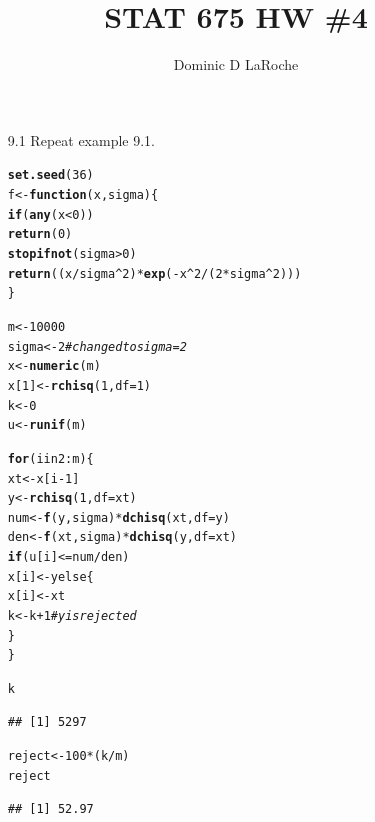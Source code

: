 \documentclass{article}\usepackage[]{graphicx}\usepackage[]{color}
\title{STAT 675 HW \#4}
\author{Dominic D LaRoche}
\makeatletter
\newcommand{\hlcom}[1]{\textcolor[rgb]{0.678,0.584,0.686}{\textit{#1}}}%
\newcommand{\hlkwd}[1]{\textcolor[rgb]{0.737,0.353,0.396}{\textbf{#1}}}%
\newenvironment{kframe}{%
 \def\at@end@of@kframe{}%
 \ifinner\ifhmode%
  \def\at@end@of@kframe{\end{minipage}}%
  \begin{minipage}{\columnwidth}%
 \fi\fi%
 \def\FrameCommand##1{\hskip\@totalleftmargin \hskip-\fboxsep
 \colorbox{shadecolor}{##1}\hskip-\fboxsep
     \hskip-\linewidth \hskip-\@totalleftmargin \hskip\columnwidth}%
 \MakeFramed {\advance\hsize-\width
   \@totalleftmargin\z@ \linewidth\hsize
   \@setminipage}}%
 {\par\unskip\endMakeFramed%
 \at@end@of@kframe}
\newenvironment{knitrout}{}{} %
\makeatother
\begin{document}
\maketitle

\begin{itemize}
\item[9.1] Repeat example 9.1.\\

\begin{knitrout}
\color{fgcolor}\begin{kframe}
\begin{alltt}
\hlkwd{set.seed}(36)
f <- \hlkwd{function}(x, sigma) \{
    \hlkwd{if} (\hlkwd{any}(x < 0)) 
        \hlkwd{return}(0)
    \hlkwd{stopifnot}(sigma > 0)
    \hlkwd{return}((x/sigma^2) * \hlkwd{exp}(-x^2/(2 * sigma^2)))
\}

m <- 10000
sigma <- 2  \hlcom{#changed to sigma=2}
x <- \hlkwd{numeric}(m)
x[1] <- \hlkwd{rchisq}(1, df = 1)
k <- 0
u <- \hlkwd{runif}(m)

\hlkwd{for} (i in 2:m) \{
    xt <- x[i - 1]
    y <- \hlkwd{rchisq}(1, df = xt)
    num <- \hlkwd{f}(y, sigma) * \hlkwd{dchisq}(xt, df = y)
    den <- \hlkwd{f}(xt, sigma) * \hlkwd{dchisq}(y, df = xt)
    \hlkwd{if} (u[i] <= num/den) 
        x[i] <- y else \{
        x[i] <- xt
        k <- k + 1  \hlcom{#y is rejected}
    \}
\}

k
\end{alltt}
\begin{verbatim}
## [1] 5297
\end{verbatim}
\begin{alltt}

reject <- 100 * (k/m)
reject
\end{alltt}
\begin{verbatim}
## [1] 52.97
\end{verbatim}
\begin{alltt}


\end{alltt}
\end{kframe}
\end{knitrout}
\end{itemize}
\end{document}
